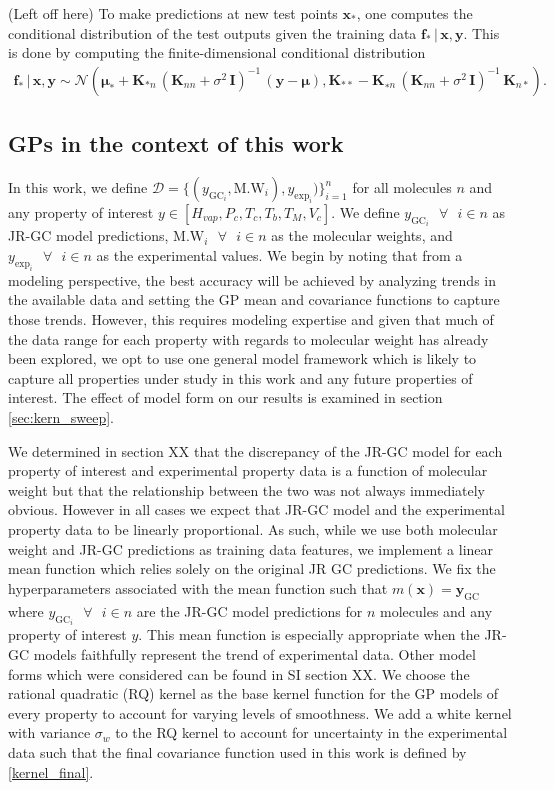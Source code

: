 \documentclass[journal=jacsat,manuscript=article]{achemso}
\newcommand{\kjtodo}[1]{{\color{red} (#1)}}
\newcommand{\xvec}{\ensuremath{\mathbf{x}}}
\newcommand{\Ygc}[1][]{\ensuremath{y_{\text{GC}_{#1}}}}
\newcommand{\Ygcvec}[1][]{\ensuremath{\mathbf{y}_{\text{GC}_{#1}}}}
\newcommand{\yexp}[1][]{\ensuremath{y_{\text{exp}_{#1}}}}
\begin{document}
{\kjtodo{Left off here} To make predictions at new test points $\xvec_*$, one computes the conditional distribution of the test outputs given the training data $\mathbf{f}_* \,|\, \xvec, \mathbf{y}$. This is done by computing the finite-dimensional conditional distribution
\begin{gather}
    \mathbf{f}_* \,|\, \xvec, \mathbf{y} \sim \mathcal{N}(\boldsymbol{\mu}_* + \mathbf{K}_{*n}\,(\mathbf{K}_{nn} +\sigma^2\,\mathbf{I})^{-1}\,(\mathbf{y}-\boldsymbol{\mu}), \mathbf{K}_{**} - \mathbf{K}_{∗n} \,(\mathbf{K}_{nn}+\sigma^2\,\mathbf{I})^{-1}\,\mathbf{K}_{n*}).   
\end{gather}

\subsection{GPs in the context of this work}
In this work, we define $\mathcal{D} = \{(\Ygc[i], \text{M.W}_i), \yexp[i])\}_{i=1}^n$ for all molecules $n$ and any property of interest $y \in [H_{vap}, P_c, T_c, T_b ,T_M, V_c]$. We define $\Ygc[i] \text{ } \forall \text{ } i\in n$ as JR-GC model predictions, $\text{M.W}_i \text{ } \forall \text{ } i\in n$ as the molecular weights, and $\yexp[i] \text{ } \forall \text{ } i\in n$ as the experimental values. We begin by noting that from a modeling perspective, the best accuracy will be achieved by analyzing trends in the available data and setting the GP mean and covariance functions to capture those trends. However, this requires modeling expertise and given that much of the data range for each property with regards to molecular weight has already been explored, we opt to use one general model framework which is likely to capture all properties under study in this work and any future properties of interest. The effect of model form on our results is examined in section \ref{sec:kern_sweep}.

We determined in section XX that the discrepancy of the JR-GC model for each property of interest and experimental property data is a function of molecular weight but that the relationship between the two was not always immediately obvious. However in all cases we expect that JR-GC model and the experimental property data to be linearly proportional. As such, while we use both molecular weight and JR-GC predictions as training data features, we implement a linear mean function which relies solely on the original JR GC predictions. We fix the hyperparameters associated with the mean function such that $m(\xvec) = \Ygcvec$ where $\Ygc[i] \text{ } \forall \text{ } i\in n$ are the JR-GC model predictions for $n$ molecules and any property of interest $y$. This mean function is especially appropriate when the JR-GC models faithfully represent the trend of experimental data. Other model forms which were considered can be found in SI section XX. We choose the rational quadratic (RQ) kernel as the base kernel function for the GP models of every property to account for varying levels of smoothness. We add a white kernel with variance $\sigma_w$ to the RQ kernel to account for uncertainty in the experimental data such that the final covariance function used in this work is defined by \eqref{kernel_final}. 

}
\end{document}
